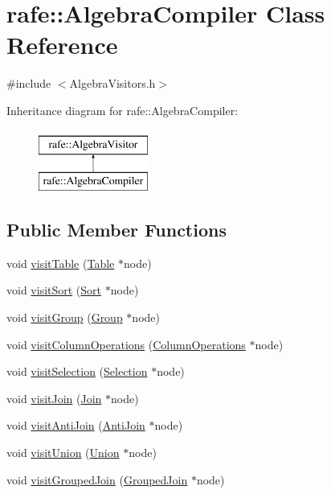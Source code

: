 \hypertarget{classrafe_1_1_algebra_compiler}{\section{rafe\+:\+:Algebra\+Compiler Class Reference}
\label{classrafe_1_1_algebra_compiler}
}


{\ttfamily \#include $<$Algebra\+Visitors.\+h$>$}

Inheritance diagram for rafe\+:\+:Algebra\+Compiler\+:\begin{figure}[H]
\begin{center}
\leavevmode
\includegraphics[height=2.000000cm]{classrafe_1_1_algebra_compiler}
\end{center}
\end{figure}
\subsection*{Public Member Functions}
\begin{DoxyCompactItemize}
\item 
void \hyperlink{classrafe_1_1_algebra_compiler_a43a2ccba61cff72a175c2fbd9c504c1d}{visit\+Table} (\hyperlink{classrafe_1_1_table}{Table} $\ast$node)
\item 
void \hyperlink{classrafe_1_1_algebra_compiler_a429613557ab8740d498228cadeaee07b}{visit\+Sort} (\hyperlink{classrafe_1_1_sort}{Sort} $\ast$node)
\item 
void \hyperlink{classrafe_1_1_algebra_compiler_ab910050702462e1437d148260d002e83}{visit\+Group} (\hyperlink{classrafe_1_1_group}{Group} $\ast$node)
\item 
void \hyperlink{classrafe_1_1_algebra_compiler_a89500aa1af613d82e231cba44eb0ccae}{visit\+Column\+Operations} (\hyperlink{classrafe_1_1_column_operations}{Column\+Operations} $\ast$node)
\item 
void \hyperlink{classrafe_1_1_algebra_compiler_ac74f4470af37f3a4d499bbfddf7aac9e}{visit\+Selection} (\hyperlink{classrafe_1_1_selection}{Selection} $\ast$node)
\item 
void \hyperlink{classrafe_1_1_algebra_compiler_a630e5f3fa963acae177df4f04fe99f1c}{visit\+Join} (\hyperlink{classrafe_1_1_join}{Join} $\ast$node)
\item 
void \hyperlink{classrafe_1_1_algebra_compiler_a605497973056e78786cdcf9ea621041c}{visit\+Anti\+Join} (\hyperlink{classrafe_1_1_anti_join}{Anti\+Join} $\ast$node)
\item 
void \hyperlink{classrafe_1_1_algebra_compiler_a325833b8f33d540a299df55def890d12}{visit\+Union} (\hyperlink{classrafe_1_1_union}{Union} $\ast$node)
\item 
void \hyperlink{classrafe_1_1_algebra_compiler_ab4eb22755e22796bf56cd03c0066b8b5}{visit\+Grouped\+Join} (\hyperlink{classrafe_1_1_grouped_join}{Grouped\+Join} $\ast$node)
\end{DoxyCompactItemize}
